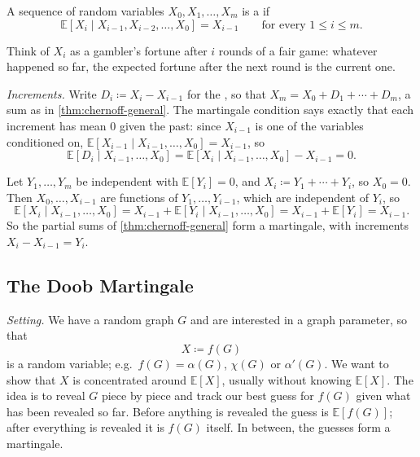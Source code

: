 \begin{definition}[Martingale]\label{def:martingale}
    A sequence of random variables \(X_{0}, X_{1}, \ldots, X_{m}\) is a  if
    \[
        \mathbb{E}[X_{i} \mid X_{i-1}, X_{i-2}, \ldots, X_{0}] = X_{i-1}
        \qquad \text{for every } 1 \le i \le m .
    \]
\end{definition}

Think of \(X_{i}\) as a gambler's fortune after \(i\) rounds of a fair game: whatever happened so far, the expected fortune after the next round is the current one.

\emph{Increments.} Write \(D_{i} \coloneqq X_{i} - X_{i-1}\) for the , so that \(X_{m} = X_{0} + D_{1} + \cdots + D_{m}\), a sum as in \autoref{thm:chernoff-general}. The martingale condition says exactly that each increment has mean \(0\) given the past: since \(X_{i-1}\) is one of the variables conditioned on, \(\mathbb{E}[X_{i-1} \mid X_{i-1}, \ldots, X_{0}] = X_{i-1}\), so
\[
    \mathbb{E}[D_{i} \mid X_{i-1}, \ldots, X_{0}] = \mathbb{E}[X_{i} \mid X_{i-1}, \ldots, X_{0}] - X_{i-1} = 0 .
\]

\begin{eg}\label{eg:sum-martingale}
    Let \(Y_{1}, \ldots, Y_{m}\) be independent with \(\mathbb{E}[Y_{i}] = 0\), and \(X_{i} \coloneqq Y_{1} + \cdots + Y_{i}\), so \(X_{0} = 0\). Then \(X_{0}, \ldots, X_{i-1}\) are functions of \(Y_{1}, \ldots, Y_{i-1}\), which are independent of \(Y_{i}\), so
    \[
        \mathbb{E}[X_{i} \mid X_{i-1}, \ldots, X_{0}] = X_{i-1} + \mathbb{E}[Y_{i} \mid X_{i-1}, \ldots, X_{0}] = X_{i-1} + \mathbb{E}[Y_{i}] = X_{i-1} .
    \]
    So the partial sums of \autoref{thm:chernoff-general} form a martingale, with increments \(X_{i} - X_{i-1} = Y_{i}\).
\end{eg}

\subsection{The Doob Martingale}\label{sec:doob}

\emph{Setting.} We have a random graph \(G\) and are interested in a graph parameter, so that
\[
    X \coloneqq f(G)
\]
is a random variable; e.g.\ \(f(G) = \alpha(G)\), \(\chi(G)\) or \(\alpha'(G)\). We want to show that \(X\) is concentrated around \(\mathbb{E}[X]\), usually without knowing \(\mathbb{E}[X]\). The idea is to reveal \(G\) piece by piece and track our best guess for \(f(G)\) given what has been revealed so far. Before anything is revealed the guess is \(\mathbb{E}[f(G)]\); after everything is revealed it is \(f(G)\) itself. In between, the guesses form a martingale.

